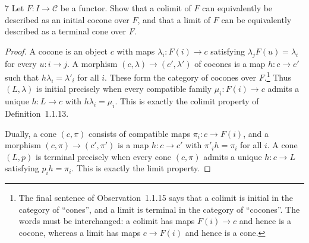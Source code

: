 \begin{exercise}{7}
Let $F\colon I\to\mathcal C$ be a functor. Show that a colimit of $F$
can equivalently be described as an initial cocone over $F$, and that
a limit of $F$ can be equivalently described as a terminal cone over $F$.

\begin{proof}
A cocone is an object $c$ with maps $\lambda_i\colon F(i)\to c$
satisfying $\lambda_jF(u)=\lambda_i$ for every $u\colon i\to j$.
A morphism $(c,\lambda)\to(c',\lambda')$ of cocones is a map
$h\colon c\to c'$ such that $h\lambda_i=\lambda'_i$ for all $i$.
These form the category of cocones over $F$.\footnote{The final
sentence of Observation~1.1.15 says that a colimit is initial in the
category of ``cones'', and a limit is terminal in the category of
``cocones''. The words must be interchanged: a colimit has maps
$F(i)\to c$ and hence is a cocone, whereas a limit has maps
$c\to F(i)$ and hence is a cone.}
Thus $(L,\lambda)$ is initial precisely when every compatible family
$\mu_i\colon F(i)\to c$ admits a unique $h\colon L\to c$ with
$h\lambda_i=\mu_i$. This is exactly the colimit property of
Definition~1.1.13.

Dually, a cone $(c,\pi)$ consists of compatible maps
$\pi_i\colon c\to F(i)$, and a morphism
$(c,\pi)\to(c',\pi')$ is a map $h\colon c\to c'$ with
$\pi'_ih=\pi_i$ for all $i$.
A cone $(L,p)$ is terminal precisely when every cone $(c,\pi)$
admits a unique $h\colon c\to L$ satisfying $p_ih=\pi_i$.
This is exactly the limit property.
\end{proof}
\end{exercise}

